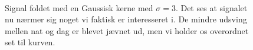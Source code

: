 \documentclass[a4paper, 10pt, danish, final]{article}
\begin{document}
\begin{figure}[!h]
    \centering
    \hspace{1em}
    \\
    \caption[]{Signal foldet med en Gaussisk kerne med $\sigma = 3$. Det
    ses at signalet nu nærmer sig noget vi faktisk er interesseret i. De
    mindre udsving mellen nat og dag er blevet jævnet ud, men vi holder
    os overordnet set til kurven.}
    \label{temp_gauss}
\end{figure}

\clearpage


%
%
\end{document}
